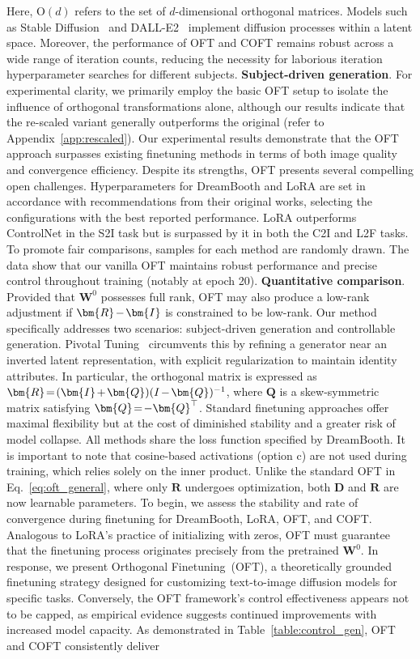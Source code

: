 {Here, $\text{O}(d)$ refers to the set of $d$-dimensional orthogonal matrices. Models such as Stable Diffusion~\cite{rombach2022high} and DALL-E2~\cite{ramesh2022hierarchical} implement diffusion processes within a latent space. Moreover, the performance of OFT and COFT remains robust across a wide range of iteration counts, reducing the necessity for laborious iteration hyperparameter searches for different subjects. \textbf{Subject-driven generation}. For experimental clarity, we primarily employ the basic OFT setup to isolate the influence of orthogonal transformations alone, although our results indicate that the re-scaled variant generally outperforms the original (refer to Appendix~\ref{app:rescaled}). Our experimental results demonstrate that the OFT approach surpasses existing finetuning methods in terms of both image quality and convergence efficiency. Despite its strengths, OFT presents several compelling open challenges. Hyperparameters for DreamBooth and LoRA are set in accordance with recommendations from their original works, selecting the configurations with the best reported performance. LoRA outperforms ControlNet in the S2I task but is surpassed by it in both the C2I and L2F tasks. To promote fair comparisons, samples for each method are randomly drawn. The data show that our vanilla OFT maintains robust performance and precise control throughout training (notably at epoch 20). \textbf{Quantitative comparison}. Provided that $\bm{W}^0$ possesses full rank, OFT may also produce a low-rank adjustment if $\thickmuskip=2mu \medmuskip=2mu \bm{R}-\bm{I}$ is constrained to be low-rank. Our method specifically addresses two scenarios: subject-driven generation and controllable generation. Pivotal Tuning~\cite{roich2022pivotal} circumvents this by refining a generator near an inverted latent representation, with explicit regularization to maintain identity attributes. In particular, the orthogonal matrix is expressed as $\thickmuskip=2mu \medmuskip=2mu \bm{R}=(\bm{I}+\bm{Q})(I-\bm{Q})^{-1}$, where $\bm{Q}$ is a skew-symmetric matrix satisfying $\thickmuskip=2mu \medmuskip=2mu \bm{Q}=-\bm{Q}^\top$. Standard finetuning approaches offer maximal flexibility but at the cost of diminished stability and a greater risk of model collapse. All methods share the loss function specified by DreamBooth. It is important to note that cosine-based activations (option c) are not used during training, which relies solely on the inner product. Unlike the standard OFT in Eq.~\eqref{eq:oft_general}, where only $\bm{R}$ undergoes optimization, both $\bm{D}$ and $\bm{R}$ are now learnable parameters. To begin, we assess the stability and rate of convergence during finetuning for DreamBooth, LoRA, OFT, and COFT. Analogous to LoRA's practice of initializing with zeros, OFT must guarantee that the finetuning process originates precisely from the pretrained $\bm{W}^0$. In response, we present Orthogonal Finetuning~(OFT), a theoretically grounded finetuning strategy designed for customizing text-to-image diffusion models for specific tasks. Conversely, the OFT framework’s control effectiveness appears not to be capped, as empirical evidence suggests continued improvements with increased model capacity. As demonstrated in Table~\ref{table:control_gen}, OFT and COFT consistently deliver }
